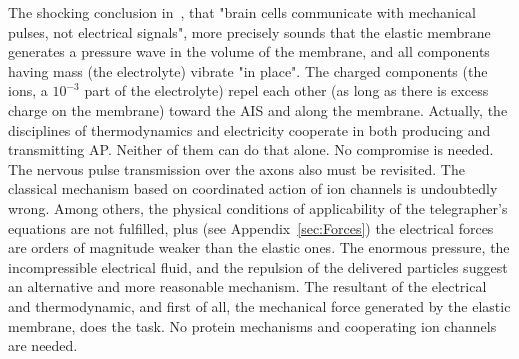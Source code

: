 The shocking conclusion in~\cite{MechanicalBrainPulses:2018}, that "brain cells communicate
with mechanical pulses, not electrical signals", more precisely sounds
that the elastic membrane generates a pressure wave in the volume of the 
membrane, and all components having mass (the electrolyte) vibrate "in place". The charged components (the ions, a $10^{-3}$ part of the electrolyte) repel each other (as long as there is excess charge on the membrane) toward the \gls{AIS} and along the membrane.
Actually, the disciplines of thermodynamics and electricity cooperate in both producing and transmitting \gls{AP}. Neither of them can do that alone. No compromise is needed.
The nervous pulse transmission over the axons 
also must be revisited. The classical mechanism based on coordinated action
of ion channels is undoubtedly wrong. Among others, the physical conditions of applicability of the telegrapher's equations are not fulfilled, plus (see Appendix~\ref{sec:Forces}) the electrical forces are orders of magnitude weaker than the elastic ones. The enormous pressure, the incompressible electrical fluid,
and the repulsion of the delivered particles suggest 
an alternative and more reasonable mechanism.
The resultant of the electrical and thermodynamic, and first of all, the mechanical force generated by the elastic membrane, does the task.
No protein mechanisms and cooperating ion channels are needed.

\else

\fi

